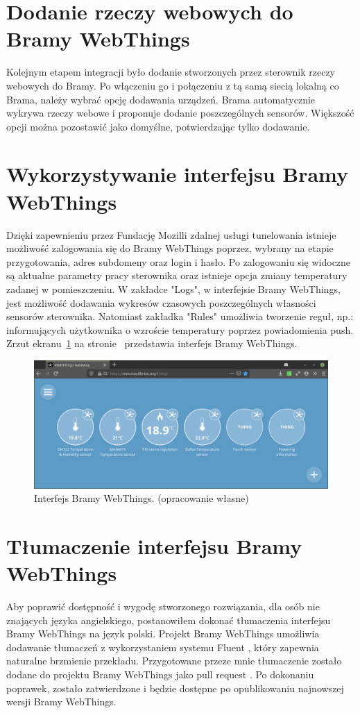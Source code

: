 \documentclass[11pt]{report}
\begin{document}
 \section{Dodanie rzeczy webowych do Bramy WebThings}
 Kolejnym etapem integracji było dodanie stworzonych przez sterownik rzeczy webowych do Bramy. Po włączeniu go i połączeniu z tą samą siecią lokalną co Brama, należy wybrać opcję dodawania urządzeń. Brama automatycznie wykrywa rzeczy webowe i proponuje dodanie poszczególnych sensorów. Większość opcji można pozostawić jako domyślne, potwierdzając tylko dodawanie.
 
 \section{Wykorzystywanie interfejsu Bramy WebThings}
 Dzięki zapewnieniu przez Fundację Mozilli zdalnej usługi tunelowania istnieje możliwość zalogowania się do Bramy WebThings poprzez, wybrany na etapie przygotowania, adres subdomeny oraz login i hasło. Po zalogowaniu się widoczne są aktualne parametry pracy sterownika oraz istnieje opcja zmiany temperatury zadanej w pomieszczeniu. W zakładce "Logs", w interfejsie Bramy WebThings, jest możliwość dodawania wykresów czasowych poszczególnych własności sensorów sterownika. Natomiast zakładka "Rules" umożliwia tworzenie reguł, np.: informujących użytkownika o wzroście temperatury poprzez powiadomienia push.
  Zrzut ekranu~\ref{fig:gateway} na stronie~\pageref{fig:gateway} przedstawia interfejs Bramy WebThings.
\begin{figure}[ht]
\centering
\includegraphics[width=0.8 \textwidth]{fig/gateway.png}
\caption{Interfejs Bramy WebThings. (opracowanie własne)}
\label{fig:gateway}
\end{figure}
 
 \section{Tłumaczenie interfejsu Bramy WebThings}
 Aby poprawić dostępność i wygodę stworzonego rozwiązania, dla osób nie znających języka angielskiego, postanowiłem dokonać tłumaczenia interfejsu Bramy WebThings na język polski. Projekt Bramy WebThings umożliwia dodawanie tłumaczeń z wykorzystaniem systemu Fluent \cite{fluent2020}, który zapewnia naturalne brzmienie przekładu. Przygotowane przeze mnie tłumaczenie zostało dodane do projektu Bramy WebThings jako pull request \cite{gatewaypl2019}. Po dokonaniu poprawek, zostało zatwierdzone i będzie dostępne po opublikowaniu najnowszej wersji Bramy WebThings.
 
\end{document}
